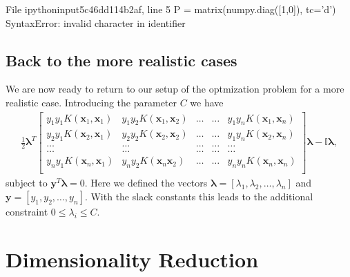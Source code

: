 \documentclass[letterpaper,10pt,english]{sphinxmanual}
\begin{document}
\begin{sphinxVerbatim}[commandchars=\\\{\}]
  File \PYGZdq{}\PYGZlt{}ipython\PYGZhy{}input\PYGZhy{}5\PYGZhy{}c46dd114b2af\PYGZgt{}\PYGZdq{}, line 5
    P = matrix(numpy.diag([1,0]), tc=’d’)
                                       \PYGZca{}
SyntaxError: invalid character in identifier
\end{sphinxVerbatim}


\subsection{Back to the more realistic cases}
\label{\detokenize{chapter7:back-to-the-more-realistic-cases}}
We are now ready to return to our setup of the optmization problem for a more realistic case. Introducing the  parameter \(C\) we have
\begin{equation*}
\begin{split}
\frac{1}{2} \boldsymbol{\lambda}^T\begin{bmatrix} y_1y_1K(\boldsymbol{x}_1,\boldsymbol{x}_1) & y_1y_2K(\boldsymbol{x}_1,\boldsymbol{x}_2) & \dots & \dots & y_1y_nK(\boldsymbol{x}_1,\boldsymbol{x}_n) \\
y_2y_1K(\boldsymbol{x}_2,\boldsymbol{x}_1) & y_2y_2K(\boldsymbol{x}_2,\boldsymbol{x}_2) & \dots & \dots & y_1y_nK(\boldsymbol{x}_2,\boldsymbol{x}_n) \\
\dots & \dots & \dots & \dots & \dots \\
\dots & \dots & \dots & \dots & \dots \\
y_ny_1K(\boldsymbol{x}_n,\boldsymbol{x}_1) & y_ny_2K(\boldsymbol{x}_n\boldsymbol{x}_2) & \dots & \dots & y_ny_nK(\boldsymbol{x}_n,\boldsymbol{x}_n) \\
\end{bmatrix}\boldsymbol{\lambda}-\mathbb{I}\boldsymbol{\lambda},
\end{split}
\end{equation*}
subject to \(\boldsymbol{y}^T\boldsymbol{\lambda}=0\). Here we defined the vectors \(\boldsymbol{\lambda} =[\lambda_1,\lambda_2,\dots,\lambda_n]\) and
\(\boldsymbol{y}=[y_1,y_2,\dots,y_n]\).
With  the slack constants this leads to the additional constraint \(0\leq \lambda_i \leq C\).



\section{Dimensionality Reduction}
\label{\detokenize{chapter8:dimensionality-reduction}}\label{\detokenize{chapter8::doc}}
\end{document}
